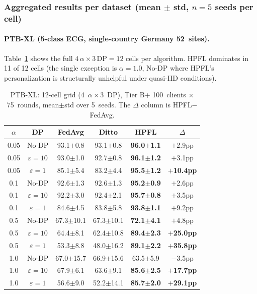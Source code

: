 \documentclass[conference]{IEEEtran}
\begin{document}
\subsubsection*{Aggregated results per dataset (mean $\pm$ std, $n{=}5$ seeds per cell)}

\paragraph{PTB-XL (5-class ECG, single-country Germany 52~sites).} Table~\ref{tab:tier_b_hpfl_ptb} shows the full $4\,\alpha\times 3\,\text{DP} = 12$ cells per algorithm. HPFL dominates in 11 of 12 cells (the single exception is $\alpha{=}1.0$, No-DP where HPFL's personalization is structurally unhelpful under quasi-IID conditions).

\begin{table}[htbp]
\centering
\caption{PTB-XL: 12-cell grid (4~$\alpha\times 3$~DP), Tier B+ 100~clients $\times$ 75~rounds, mean$\pm$std over 5~seeds. The $\Delta$ column is HPFL$-$FedAvg.}
\label{tab:tier_b_hpfl_ptb}
\small
\setlength{\tabcolsep}{4pt}
\begin{tabular}{cccccc}
\toprule
\textbf{$\alpha$} & \textbf{DP} & \textbf{FedAvg} & \textbf{Ditto} & \textbf{HPFL} & \textbf{$\Delta$} \\
\midrule
0.05 & No-DP & 93.1$\pm$0.8 & 93.1$\pm$0.8 & \textbf{96.0$\pm$1.1} & $+$2.9pp \\
0.05 & $\varepsilon{=}10$ & 93.0$\pm$1.0 & 92.7$\pm$0.8 & \textbf{96.1$\pm$1.2} & $+$3.1pp \\
0.05 & $\varepsilon{=}1$ & 85.1$\pm$5.4 & 83.2$\pm$4.4 & \textbf{95.5$\pm$1.2} & \textbf{$+$10.4pp} \\
0.1 & No-DP & 92.6$\pm$1.3 & 92.6$\pm$1.3 & \textbf{95.2$\pm$0.9} & $+$2.6pp \\
0.1 & $\varepsilon{=}10$ & 92.2$\pm$3.0 & 92.4$\pm$2.1 & \textbf{95.7$\pm$0.8} & $+$3.5pp \\
0.1 & $\varepsilon{=}1$ & 84.6$\pm$4.5 & 83.8$\pm$5.8 & \textbf{93.8$\pm$1.1} & $+$9.2pp \\
0.5 & No-DP & 67.3$\pm$10.1 & 67.3$\pm$10.1 & \textbf{72.1$\pm$4.1} & $+$4.8pp \\
0.5 & $\varepsilon{=}10$ & 64.4$\pm$8.1 & 62.4$\pm$10.8 & \textbf{89.4$\pm$2.3} & \textbf{$+$25.0pp} \\
0.5 & $\varepsilon{=}1$ & 53.3$\pm$8.8 & 48.0$\pm$16.2 & \textbf{89.1$\pm$2.2} & \textbf{$+$35.8pp} \\
1.0 & No-DP & 67.0$\pm$15.7 & 66.9$\pm$15.6 & 63.5$\pm$5.9 & $-$3.5pp \\
1.0 & $\varepsilon{=}10$ & 67.9$\pm$6.1 & 63.6$\pm$9.1 & \textbf{85.6$\pm$2.5} & \textbf{$+$17.7pp} \\
1.0 & $\varepsilon{=}1$ & 56.6$\pm$9.0 & 52.2$\pm$14.1 & \textbf{85.7$\pm$2.0} & \textbf{$+$29.1pp} \\
\bottomrule
\end{tabular}


\end{table}
\end{document}
